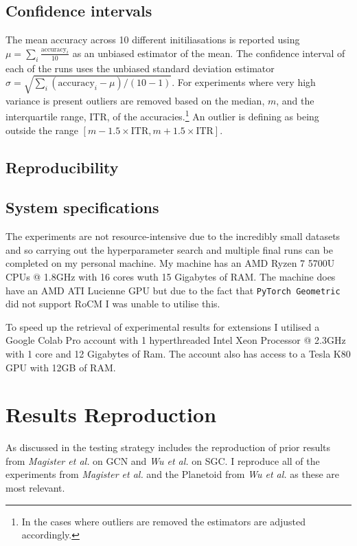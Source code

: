 \subsection{Confidence intervals}
\label{sec:reporting}
The mean accuracy across 10 different initiliasations is reported using $\mu = \sum_i\frac{\text{accuracy}_i}{10}$ as an unbiased estimator of the mean.
The confidence interval of each of the runs uses the unbiased standard deviation estimator $\sigma = \sqrt{\sum_i(\text{accuracy}_i - \mu)/(10 - 1)}$.
For experiments where very high variance is present outliers are removed based on the median, $m$, and the interquartile range, $\text{ITR}$, of the accuracies.\footnote{In the cases where outliers are removed the estimators are adjusted accordingly.}
An outlier is defining as being outside the range $[m - 1.5 \times \text{ITR}, m + 1.5 \times \text{ITR}]$.


\subsection{Reproducibility}

\subsection{System specifications}
The experiments are not resource-intensive due to the incredibly small datasets and so carrying out the hyperparameter search and multiple final runs can be completed on my personal machine.
My machine has an AMD Ryzen 7 5700U CPUs @ 1.8GHz with 16 cores wuth 15 Gigabytes of RAM.
The machine does have an AMD ATI Lucienne GPU but due to the fact that \texttt{PyTorch Geometric}\cite{paszke2019pytorch} did not support RoCM I was unable to utilise this.

To speed up the retrieval of experimental results for extensions I utilised a Google Colab Pro account with 1 hyperthreaded Intel Xeon Processor @ 2.3GHz with 1 core and 12 Gigabytes of Ram.
The account also has access to a Tesla K80 GPU with 12GB of RAM.


\section{Results Reproduction}
\label{sec:reproduction}

As discussed in  the testing strategy includes the reproduction of prior results from \textit{Magister et al.}\cite{magister2021gcexplainer} on GCN and \textit{Wu et al.}\cite{wu2019simplifying} on SGC.
I reproduce all of the experiments from \textit{Magister et al.} and the Planetoid\cite{kipf2016semi} from \textit{Wu et al.} as these are most relevant.

